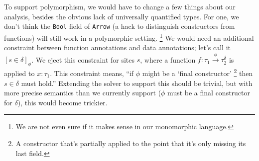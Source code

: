 \documentclass[a4paper]{scrartcl}
\begin{document}
To support polymorphism, we would have to change a few things about our analysis,
besides the obvious lack of universally quantified types. For one, we don't
think the \texttt{Bool} field of \texttt{Arrow} (a hack to distinguish
constructors from functions) will still work in a polymorphic setting.%
\footnote{We are not even sure if it makes sense in our monomorphic language.}
We would need an additional constraint between function annotations and
data annotations; let's call it $[s \in \delta]_\phi$. We eject this constraint
for sites $s$, where a function $f : \tau_1 \xrightarrow{\phi} \tau_2^\delta$
is applied to $x : \tau_1$. This constraint means, ``if $\phi$ might be
a `final constructor'%
\footnote{A constructor that's partially applied to the point that it's only
missing its last field.}
then $s \in \delta$ must hold.'' Extending the solver to support this should be
trivial, but with more precise semantics than we currently support ($\phi$ must
be a final constructor for $\delta$), this would become trickier.
\end{document}

